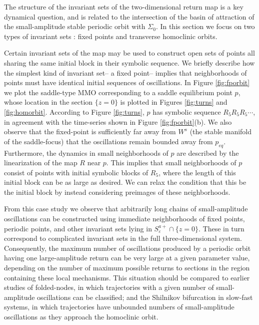\documentclass[aip, cha, sd, amsmath,amssymb, preprint]{revtex4-1}
\begin{document}
The structure of the invariant sets of the two-dimensional return map is a key dynamical question, and is related to the intersection of the basin of attraction of the small-amplitude stable periodic orbit with $\Sigma_0$. In this section we focus on two types of invariant sets : fixed points and transverse homoclinic orbits. 

Certain invariant sets of the map may be used to construct open sets of points all sharing the same initial block in their symbolic sequence. We briefly describe how the simplest kind of invariant set-- a fixed point-- implies that neighborhoods of points must have identical initial sequences of oscillations. In Figure \ref{fig:fporbit} we plot the saddle-type MMO corresponding to a saddle equilibrium point $p$, whose location in the section $\{z = 0\}$ is plotted in Figures \ref{fig:turns} and \ref{fig:homorbit}. According to Figure \ref{fig:turns}, $p$ has symbolic sequence $R_5 R_5 R_5 \cdots$, in agreement with the time-series shown in Figure \ref{fig:fporbit}(b). We also observe that the fixed-point is sufficiently far away from $W^s$ (the stable manifold of the saddle-focus) that the oscillations remain bounded away from $p_{eq}$. Furthermore, the dynamics in small neighborhoods of $p$ are described by the linearization of the map $R$ near $p$. This implies that small neighborhoods of $p$ consist of points with initial symbolic blocks of $R_5$, where the length of this initial block can be as large as desired. We can relax the condition that this be the initial block by instead considering preimages of these neighborhoods. 

From this case study we observe that arbitrarily long chains of small-amplitude oscillations can be constructed using immediate neighborhoods of fixed points, periodic points, and other invariant sets lying in $S^{a+}_{ \varepsilon} \cap \{z = 0\}$. These in turn correspond to complicated invariant sets in the full three-dimensional system. Consequently, the maximum number of oscillations produced by a periodic orbit having one large-amplitude return can be very large at a given parameter value, depending on the number of maximum possible returns to sections in the region containing these local mechanisms. This situation should be compared to earlier studies of folded-nodes, in which trajectories with a given number of small-amplitude oscillations can be classified\cite{wechselberger2005}; and the Shilnikov bifurcation in slow-fast systems, in which trajectories have unbounded numbers of small-amplitude oscillations as they approach the homoclinic orbit.\cite{guckenheimer2015}
\end{document}
